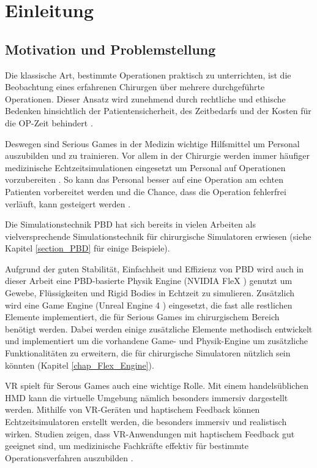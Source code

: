 \chapter{Einleitung}
\label{chap_Einleitung}



\section{Motivation und Problemstellung}


Die klassische Art, bestimmte Operationen praktisch zu unterrichten, ist die Beobachtung eines erfahrenen Chirurgen über mehrere durchgeführte Operationen. Dieser Ansatz wird zunehmend durch rechtliche und ethische Bedenken hinsichtlich der Patientensicherheit, des Zeitbedarfs und der Kosten für die OP-Zeit behindert \cite{SurgSim}.

Deswegen sind Serious Games in der Medizin wichtige Hilfsmittel um Personal auszubilden und zu trainieren. Vor allem in der Chirurgie werden immer häufiger medizinische Echtzeitsimulationen eingesetzt um Personal auf Operationen vorzubereiten \cite{SimRole}. So kann das Personal besser auf eine Operation am echten Patienten vorbereitet werden und die Chance, dass die Operation fehlerfrei verläuft, kann gesteigert werden \cite{VRNeuro}.

Die Simulationstechnik \ac{PBD} \cite{PBD} hat sich bereits in vielen Arbeiten als vielversprechende Simulationstechnik für chirurgische Simulatoren erwiesen (siehe Kapitel \ref{section_PBD} für einige Beispiele). 

Aufgrund der guten Stabilität, Einfachheit und Effizienz von PBD wird auch in dieser Arbeit eine PBD-basierte Physik Engine (NVIDIA FleX \cite{UPP}) genutzt um Gewebe, Flüssigkeiten und Rigid Bodies in Echtzeit zu simulieren. Zusätzlich wird eine Game Engine (Unreal Engine 4 \cite{UE4FlexDoc}) eingesetzt, die fast alle restlichen Elemente implementiert, die für Serious Games im chirurgischem Bereich benötigt werden. Dabei werden einige zusätzliche Elemente methodisch entwickelt und implementiert um die vorhandene Game- und Physik-Engine um zusätzliche Funktionalitäten zu erweitern, die für chirurgische Simulatoren nützlich sein könnten (Kapitel \ref{chap_Flex_Engine}).

\ac{VR} spielt für Serous Games auch eine wichtige Rolle. Mit einem handelsüblichen \ac{HMD} kann die virtuelle Umgebung nämlich besonders immersiv dargestellt werden.
Mithilfe von VR-Geräten und haptischem Feedback können Echtzeitsimulatoren erstellt werden, die besonders immersiv und realistisch wirken. 
Studien zeigen, dass VR-Anwendungen mit haptischem Feedback gut geeignet sind, um medizinische Fachkräfte effektiv für bestimmte Operationsverfahren auszubilden \cite{VRSim20} \cite{VRHapticSim}.



